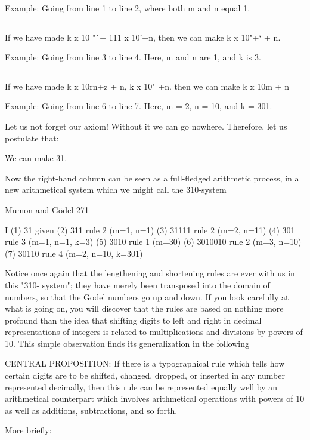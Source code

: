 Example: Going from line 1 to line 2, where both m and n equal 1.

\rule 3: If we have made k x 10 "`+ 111 x 10'+n, then we can make k x 10"+` + n.\par

Example: Going from line 3 to line 4. Here, m and n are 1, and k is 3.

\rule 4: If we have made k x 10rn+z + n, k x 10" +n. then we can make k x 10m + n\par

Example: Going from line 6 to line 7. Here, m = 2, n = 10, and k = 301.

Let us not forget our axiom! Without it we can go nowhere. Therefore, let us postulate
that:

                                     We can make 31.

Now the right-hand column can be seen as a full-fledged arithmetic process, in a new
arithmetical system which we might call the 310-system




Mumon and Gödel                                                                         271

I
(1)      31             given
(2)      311            rule 2 (m=1, n=1)
(3)      31111          rule 2 (m=2, n=11)
(4)      301            rule 3 (m=1, n=1, k=3)
(5)      3010           rule 1 (m=30)
(6)      3010010        rule 2 (m=3, n=10)
(7)      30110          rule 4 (m=2, n=10, k=301)

Notice once again that the lengthening and shortening rules are ever with us in this "310-
system"; they have merely been transposed into the domain of numbers, so that the Godel
numbers go up and down. If you look carefully at what is going on, you will discover that
the rules are based on nothing more profound than the idea that shifting digits to left and
right in decimal representations of integers is related to multiplications and divisions by
powers of 10. This simple observation finds its generalization in the following

      CENTRAL PROPOSITION: If there is a typographical rule which tells how
      certain digits are to be shifted, changed, dropped, or inserted in any number
      represented decimally, then this rule can be represented equally well by an
      arithmetical counterpart which involves arithmetical operations with powers of 10
      as well as additions, subtractions, and so forth.

                                       More briefly:

